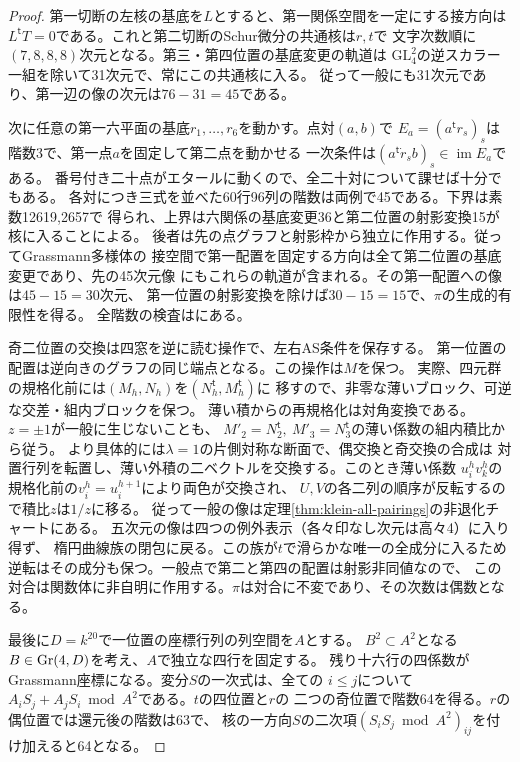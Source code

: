 \begin{proof}
第一切断の左核の基底を$L$とすると、第一関係空間を一定にする接方向は
$L^{\mathsf t}T=0$である。これと第二切断のSchur微分の共通核は$r,t$で
文字次数順に$(7,8,8,8)$次元となる。第三・第四位置の基底変更の軌道は
$\mathrm{GL}_4^2$の逆スカラー一組を除いて31次元で、常にこの共通核に入る。
従って一般にも31次元であり、第一辺の像の次元は$76-31=45$である。

次に任意の第一六平面の基底$r_1,\ldots,r_6$を動かす。点対$(a,b)$で
$E_a=(a^{\mathsf t}r_s)_s$は階数3で、第一点$a$を固定して第二点を動かせる
一次条件は$(a^{\mathsf t}\dot r_s b)_s\in\operatorname{im}E_a$である。
番号付き二十点がエタールに動くので、全二十対について課せば十分でもある。
各対につき三式を並べた60行96列の階数は両例で45である。下界は素数12619,2657で
得られ、上界は六関係の基底変更36と第二位置の射影変換15が核に入ることによる。
後者は先の点グラフと射影枠から独立に作用する。従ってGrassmann多様体の
接空間で第一配置を固定する方向は全て第二位置の基底変更であり、先の45次元像
にもこれらの軌道が含まれる。その第一配置への像は$45-15=30$次元、
第一位置の射影変換を除けば$30-15=15$で、$\pi$の生成的有限性を得る。
全階数の検査はにある。

奇二位置の交換は四窓を逆に読む操作で、左右AS条件を保存する。
第一位置の配置は逆向きのグラフの同じ端点となる。この操作は$M$を保つ。
実際、四元群の規格化前には$(M_h,N_h)$を$(N_h^{\mathsf t},M_h^{\mathsf t})$に
移すので、非零な薄いブロック、可逆な交差・組内ブロックを保つ。
薄い積からの再規格化は対角変換である。$z=\pm1$が一般に生じないことも、
$M'_2=N_2^{\mathsf t},\ M'_3=N_3^{\mathsf t}$の薄い係数の組内積比から従う。
より具体的には$\lambda=1$の片側対称な断面で、偶交換と奇交換の合成は
対置行列を転置し、薄い外積の二ベクトルを交換する。このとき薄い係数
$u_i^h v_k^h$の規格化前の$v_i^h=u_i^{h+1}$により両色が交換され、
$U,V$の各二列の順序が反転するので積比$z$は$1/z$に移る。
従って一般の像は定理\ref{thm:klein-all-pairings}の非退化チャートにある。
五次元の像は四つの例外表示（各々印なし次元は高々4）に入り得ず、
楕円曲線族の閉包に戻る。この族が$t$で滑らかな唯一の全成分に入るため
逆転はその成分も保つ。一般点で第二と第四の配置は射影非同値なので、
この対合は関数体に非自明に作用する。$\pi$は対合に不変であり、その次数は偶数となる。

最後に$D=k^{20}$で一位置の座標行列の列空間を$A$とする。
$B^2\subset A^2$となる$B\in\operatorname{Gr}(4,D)$を考え、$A$で独立な四行を固定する。
残り十六行の四係数がGrassmann座標になる。変分$S$の一次式は、全ての
$i\le j$について$A_i S_j+A_j S_i\bmod A^2$である。$t$の四位置と$r$の
二つの奇位置で階数64を得る。$r$の偶位置では還元後の階数は63で、
核の一方向$S$の二次項$(S_i S_j\bmod A^2)_{ij}$を付け加えると64となる。


\end{proof}
